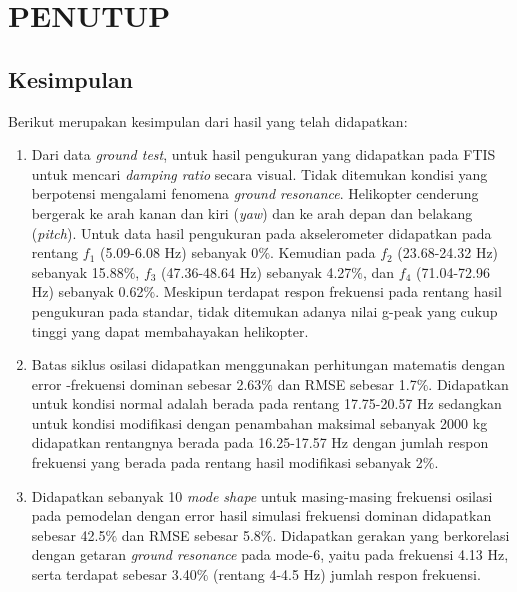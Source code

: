 \chapter{PENUTUP}
\label{chap:penutup}


\section{Kesimpulan}
\label{sec:kesimpulan}
\thispagestyle{newchap}

Berikut merupakan kesimpulan dari hasil yang telah didapatkan:

\begin{enumerate}[nolistsep]

	\item Dari data \textit{ground test}, untuk hasil pengukuran yang didapatkan pada FTIS untuk mencari \textit{damping ratio} secara visual. Tidak ditemukan kondisi yang berpotensi mengalami fenomena \textit{ground resonance}. Helikopter cenderung bergerak ke arah kanan dan kiri (\textit{yaw}) dan ke arah depan dan belakang (\textit{pitch}). Untuk data hasil pengukuran pada akselerometer didapatkan pada rentang $f_1$ (5.09-6.08 Hz) sebanyak 0$\%$. Kemudian pada $f_2$ (23.68-24.32 Hz) sebanyak 15.88$\%$, $f_3$ (47.36-48.64 Hz) sebanyak 4.27$\%$, dan $f_4$ (71.04-72.96 Hz) sebanyak 0.62$\%$. Meskipun terdapat respon frekuensi pada rentang hasil pengukuran pada standar, tidak ditemukan adanya nilai g-peak yang cukup tinggi yang dapat membahayakan helikopter.

	\item Batas siklus osilasi didapatkan menggunakan perhitungan matematis dengan error \hyp{}frekuensi dominan sebesar 2.63$\%$ dan RMSE sebesar 1.7$\%$. Didapatkan untuk kondisi normal adalah berada pada rentang 17.75-20.57 Hz sedangkan untuk kondisi modifikasi dengan penambahan maksimal sebanyak 2000 kg didapatkan rentangnya berada pada 16.25-17.57 Hz dengan jumlah respon frekuensi yang berada pada rentang hasil modifikasi sebanyak 2$\%$.
     
	\item Didapatkan sebanyak 10 \textit{mode shape} untuk masing-masing frekuensi osilasi pada pemodelan dengan error hasil simulasi frekuensi dominan didapatkan sebesar 42.5$\%$ dan RMSE sebesar 5.8$\%$. Didapatkan gerakan yang berkorelasi dengan getaran \textit{ground resonance} pada mode-6, yaitu pada frekuensi 4.13 Hz, serta terdapat sebesar 3.40$\%$ (rentang 4-4.5 Hz) jumlah respon frekuensi.
  
\end{enumerate}

